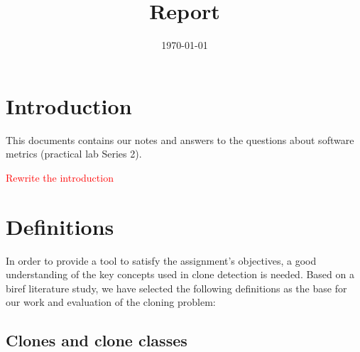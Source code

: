 \documentclass{uva-inf-article}
\title{Report}
\date{\today}
\newcommand\todo[1]{\textcolor{red}{#1}}
\begin{document}
\maketitle




\section{Introduction}

This documents contains our notes and answers to the questions about software metrics (practical lab Series 2).

\todo{Rewrite the introduction}

\section{Definitions}

In order to provide a tool to satisfy the assignment's objectives, a good understanding of the key concepts used in clone detection is needed. Based on a biref literature study, we have selected the following definitions as the base for our work and evaluation of the cloning problem:

\subsection{Clones and clone classes}
\end{document}
